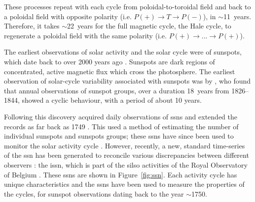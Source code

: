 

These processes repeat with each cycle from poloidal-to-toroidal field and back to a poloidal field with opposite polarity (i.e. $P(+)\rightarrow T\rightarrow P(-)$), in $\sim$11~years. Therefore, it takes $\sim$22~years for the full magnetic cycle, the Hale cycle, to regenerate a poloidal field with the same polarity (i.e. $P(+)\rightarrow ...\rightarrow P(+)$).

The earliest observations of solar activity and the solar cycle were of sunspots, which date back to over 2000 years ago \citep{clark_interpretation_1978}. Sunspots are dark regions of concentrated, active magnetic flux which cross the photosphere. The earliest observation of solar-cycle variability associated with sunspots was by \citet{schwabe_sonnenbeobachtungen_1844}, who found that annual observations of sunspot groups, over a duration 18~years from 1826--1844, showed a cyclic behaviour, with a period of about 10 years.

Following this discovery \citet{wolf_mittheilungen_1856, wolf_extract_1859} acquired daily observations of \glspl{ssn} and extended the records as far back as 1749 \citep{hathaway_solar_2015}. This used a method of estimating the number of individual sunspots and sunspots groups; these \glspl{ssn} have since been used to monitor the solar activity cycle \citep{wolf_extract_1859, wolf_abstract_1861}. However, recently, a new, standard time-series of the \gls{ssn} has been generated to reconcile various discrepancies between different observers \citep{clette_preface_2016,clette_new_2016}: the \gls{issn}, which is part of the \gls{silso} activities of the Royal Observatory of Belgium \citep{silso_world_data_center_international_2020}. These \glspl{ssn} are shown in Figure~\ref{fig:ssn}. Each activity cycle has unique characteristics and the \glspl{ssn} have been used to measure the properties of the cycles, for sunspot observations dating back to the year $\sim$1750.

